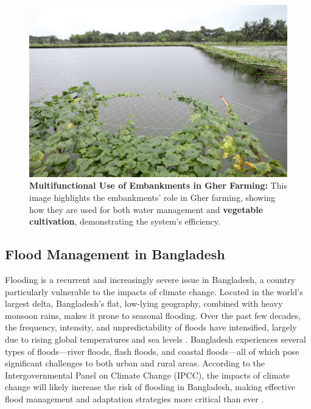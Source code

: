 \documentclass[conference]{IEEEtran}
\begin{document}
\begin{figure}[h]
    \centering
    \includegraphics[width=\linewidth]{gher_embankments.jpg}
    \caption{\textbf{Multifunctional Use of Embankments in Gher Farming: } This image highlights the embankments’ role in Gher farming, showing how they are used for both water management and \textbf{vegetable cultivation}, demonstrating the system’s efficiency. }
    \label{fig:gher_embankments}
\end{figure}


\subsection{\textbf{Flood Management in Bangladesh}}
Flooding is a recurrent and increasingly severe issue in Bangladesh, a country particularly vulnerable to the impacts of climate change. Located in the world’s largest delta, Bangladesh's flat, low-lying geography, combined with heavy monsoon rains, makes it prone to seasonal flooding. Over the past few decades, the frequency, intensity, and unpredictability of floods have intensified, largely due to rising global temperatures and sea levels \cite{ref7}. Bangladesh experiences several types of floods—river floods, flash floods, and coastal floods—all of which pose significant challenges to both urban and rural areas. According to the Intergovernmental Panel on Climate Change (IPCC), the impacts of climate change will likely increase the risk of flooding in Bangladesh, making effective flood management and adaptation strategies more critical than ever \cite{ref8}.
\end{document}
